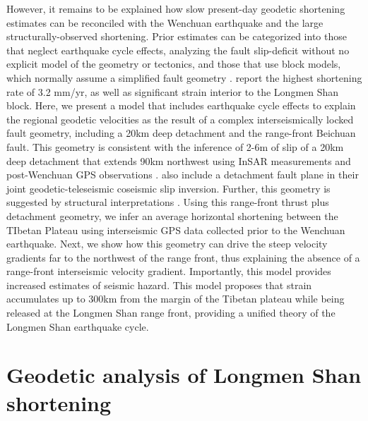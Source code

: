 \documentclass[12pt]{article}
\begin{document}
However, it remains to be explained how slow present-day geodetic shortening estimates can be reconciled with the Wenchuan earthquake and the large structurally-observed shortening. Prior estimates can be categorized into those that neglect earthquake cycle effects, analyzing the fault slip-deficit without no explicit model of the geometry or tectonics, \citep{chen00, shen05} and those that use block models, which normally assume a simplified fault geometry \citep{Meade07c, Loveless2011, Burchfiel2008a}. \citet{Loveless2011} report the highest shortening rate of 3.2 mm/yr, as well as significant strain interior to the Longmen Shan block. Here, we present a model that includes earthquake cycle effects to explain the regional geodetic velocities as the result of a complex interseismically locked fault geometry, including a 20km deep detachment and the range-front Beichuan fault.  This geometry is consistent with the inference of 2-6m of slip of a 20km deep detachment that extends 90km northwest using InSAR measurements and post-Wenchuan GPS observations \citep{Qi2011}. \citet{Fielding2013b} also include a detachment fault plane in their joint geodetic-teleseismic coseismic slip inversion. Further, this geometry is suggested by structural interpretations \citep{Hubbard2010, Li2010}. Using this range-front thrust plus detachment geometry, we infer an average horizontal shortening between the TIbetan Plateau using interseismic GPS data collected prior to the Wenchuan earthquake.  Next, we show how this geometry can drive the steep velocity gradients far to the northwest of the range front, thus explaining the absence of a range-front interseismic velocity gradient. Importantly, this model provides increased estimates of seismic hazard. This model proposes that strain accumulates up to 300km from the margin of the Tibetan plateau while being released at the Longmen Shan range front, providing a unified theory of the Longmen Shan earthquake cycle. 

\section{Geodetic analysis of Longmen Shan shortening}
\end{document}
